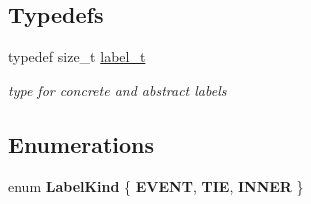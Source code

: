 \subsection*{Typedefs}
\begin{DoxyCompactItemize}
\item 
\mbox{\label{group__output_ga22fde970e635fcf63962743b2d5c441d}} 
typedef size\+\_\+t \mbox{\hyperlink{group__output_ga22fde970e635fcf63962743b2d5c441d}{label\+\_\+t}}
\begin{DoxyCompactList}\small\item\em type for concrete and abstract labels \end{DoxyCompactList}\end{DoxyCompactItemize}
\subsection*{Enumerations}
\begin{DoxyCompactItemize}
\item 
\mbox{\label{group__output_ga3ff5a8deeeca12e8b6fea9c51eccd987}} 
enum {\bfseries Label\+Kind} \{ {\bfseries E\+V\+E\+NT}, 
{\bfseries T\+IE}, 
{\bfseries I\+N\+N\+ER}
 \}
\end{DoxyCompactItemize}
